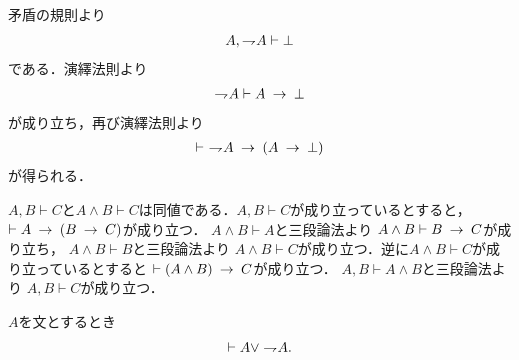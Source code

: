 	\begin{prf}
		矛盾の規則より
		\begin{align}
			A,\rightharpoondown\hspace{-0.25em} A \vdash \bot
		\end{align}
		である．演繹法則より
		\begin{align}
			\rightharpoondown\hspace{-0.25em} A \vdash A \hspace{0.25em}\rightarrow\hspace{0.25em} \bot
		\end{align}
		が成り立ち，再び演繹法則より
		\begin{align}
			\vdash\ \rightharpoondown\hspace{-0.25em} A \hspace{0.25em}\rightarrow\hspace{0.25em} (A \hspace{0.25em}\rightarrow\hspace{0.25em} \bot)
		\end{align}
		が得られる．
		\QED
	\end{prf}
	
	$A,B \vdash C$と$A \wedge B \vdash C$は同値である．$A,B \vdash C$が成り立っているとすると，
	$\vdash A \hspace{0.25em}\rightarrow\hspace{0.25em} (B \hspace{0.25em}\rightarrow\hspace{0.25em} C)$が成り立つ．
	$A \wedge B \vdash A$と三段論法より
	$A \wedge B \vdash B \hspace{0.25em}\rightarrow\hspace{0.25em} C$が成り立ち，
	$A \wedge B \vdash B$と三段論法より
	$A \wedge B \vdash C$が成り立つ．逆に$A \wedge B \vdash C$が成り立っているとすると
	$\vdash (A \wedge B) \hspace{0.25em}\rightarrow\hspace{0.25em} C$が成り立つ．
	$A,B \vdash A \wedge B$と三段論法より
	$A, B \vdash C$が成り立つ．
	
	\begin{screen}
		\begin{logicalthm}[排中律]\label{logicalthm:law_of_excluded_middle}
			$A$を文とするとき
			\begin{align}
				\vdash A \vee \rightharpoondown\hspace{-0.25em} A.
			\end{align}
		\end{logicalthm}
	\end{screen}
	
